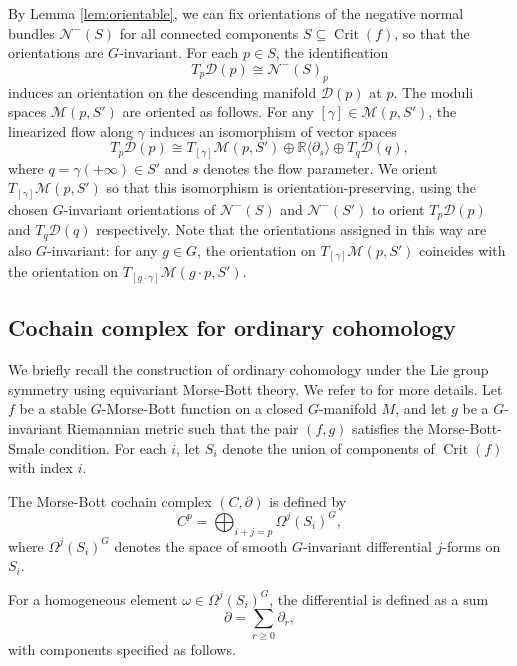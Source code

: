 \documentclass[11pt]{amsart}
\theoremstyle{definition}
\numberwithin{equation}{subsection}
\newcommand{\R}{\mathbb{R}}
\DeclareMathOperator{\crit}{Crit}
\newcommand{\p}{\partial}
\begin{document}
By Lemma \ref{lem:orientable}, we can fix orientations of the negative normal bundles $\mathcal{N}^-(S)$ for all connected components $S\subseteq\crit(f)$, so that the orientations are $G$-invariant.
For each $p\in S$, the identification
\[
T_p\mathscr{D}(p)\cong \mathcal{N}^-(S)_p
\]
induces an orientation on the descending manifold $\mathscr{D}(p)$ at $p$.
The moduli spaces $\mathcal{M}(p,S')$ are oriented as follows.
For any $[\gamma]\in\mathcal{M}(p,S')$, the linearized flow along $\gamma$ induces an isomorphism of vector spaces
\[
T_p\mathscr{D}(p)\cong T_{[\gamma]}\mathcal{M}(p,S') \oplus \R\langle \p_s\rangle \oplus T_q\mathscr{D}(q),
\]
where $q=\gamma(+\infty)\in S'$ and $s$ denotes the flow parameter.
We orient $T_{[\gamma]}\mathcal{M}(p,S')$ so that this isomorphism is orientation-preserving, using the chosen $G$-invariant orientations of $\mathcal{N}^-(S)$ and $\mathcal{N}^-(S')$ to orient $T_p\mathscr{D}(p)$ and $T_q\mathscr{D}(q)$ respectively. Note that the orientations assigned in this way are also $G$-invariant: for any $g\in G$, the orientation on $T_{[\gamma]}\mathcal{M}(p,S')$ coincides with the orientation on $T_{[g\cdot \gamma]}\mathcal{M}(g\cdot p,S')$.

\subsection{Cochain complex for ordinary cohomology}

We briefly recall the construction of ordinary cohomology under the Lie group symmetry using equivariant Morse-Bott theory. We refer to \cite{zhuang2025analytictopologicalrealizationsinvariant} for more details. 
Let $f$ be a stable $G$-Morse-Bott function on a closed $G$-manifold $M$, and let $g$ be a $G$-invariant Riemannian metric such that the pair $(f,g)$ satisfies the Morse-Bott-Smale condition.  
For each $i$, let $S_i$ denote the union of components of $\crit(f)$ with index $i$.

The Morse-Bott cochain complex $(C,\p)$ is defined by
\[
C^p = \bigoplus_{i+j=p} \Omega^j(S_i)^G,
\]
where $\Omega^j(S_i)^G$ denotes the space of smooth $G$-invariant differential $j$-forms on $S_i$.

For a homogeneous element $\omega \in \Omega^j(S_i)^G$, the differential is defined as a sum
\[
\p = \sum_{r \ge 0} \p_r,
\]
with components specified as follows.
\end{document}
